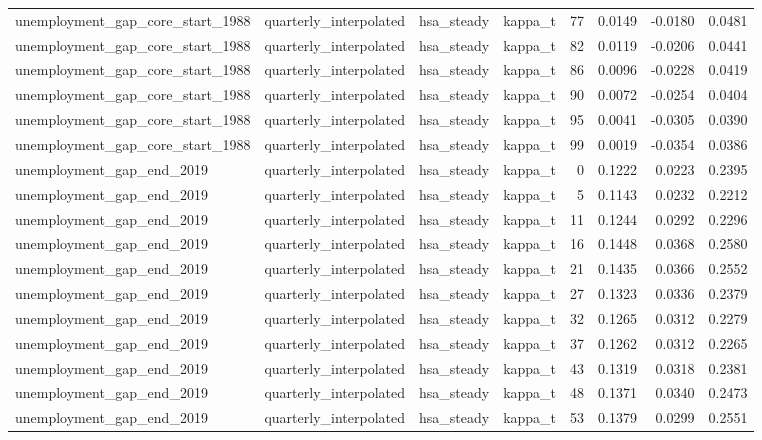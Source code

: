 \begin{tabular}{llllrrrr}
unemployment\_gap\_core\_start\_1988 & quarterly\_interpolated & hsa\_steady & kappa\_t & 77 & 0.0149 & -0.0180 & 0.0481 \\
unemployment\_gap\_core\_start\_1988 & quarterly\_interpolated & hsa\_steady & kappa\_t & 82 & 0.0119 & -0.0206 & 0.0441 \\
unemployment\_gap\_core\_start\_1988 & quarterly\_interpolated & hsa\_steady & kappa\_t & 86 & 0.0096 & -0.0228 & 0.0419 \\
unemployment\_gap\_core\_start\_1988 & quarterly\_interpolated & hsa\_steady & kappa\_t & 90 & 0.0072 & -0.0254 & 0.0404 \\
unemployment\_gap\_core\_start\_1988 & quarterly\_interpolated & hsa\_steady & kappa\_t & 95 & 0.0041 & -0.0305 & 0.0390 \\
unemployment\_gap\_core\_start\_1988 & quarterly\_interpolated & hsa\_steady & kappa\_t & 99 & 0.0019 & -0.0354 & 0.0386 \\
unemployment\_gap\_end\_2019 & quarterly\_interpolated & hsa\_steady & kappa\_t & 0 & 0.1222 & 0.0223 & 0.2395 \\
unemployment\_gap\_end\_2019 & quarterly\_interpolated & hsa\_steady & kappa\_t & 5 & 0.1143 & 0.0232 & 0.2212 \\
unemployment\_gap\_end\_2019 & quarterly\_interpolated & hsa\_steady & kappa\_t & 11 & 0.1244 & 0.0292 & 0.2296 \\
unemployment\_gap\_end\_2019 & quarterly\_interpolated & hsa\_steady & kappa\_t & 16 & 0.1448 & 0.0368 & 0.2580 \\
unemployment\_gap\_end\_2019 & quarterly\_interpolated & hsa\_steady & kappa\_t & 21 & 0.1435 & 0.0366 & 0.2552 \\
unemployment\_gap\_end\_2019 & quarterly\_interpolated & hsa\_steady & kappa\_t & 27 & 0.1323 & 0.0336 & 0.2379 \\
unemployment\_gap\_end\_2019 & quarterly\_interpolated & hsa\_steady & kappa\_t & 32 & 0.1265 & 0.0312 & 0.2279 \\
unemployment\_gap\_end\_2019 & quarterly\_interpolated & hsa\_steady & kappa\_t & 37 & 0.1262 & 0.0312 & 0.2265 \\
unemployment\_gap\_end\_2019 & quarterly\_interpolated & hsa\_steady & kappa\_t & 43 & 0.1319 & 0.0318 & 0.2381 \\
unemployment\_gap\_end\_2019 & quarterly\_interpolated & hsa\_steady & kappa\_t & 48 & 0.1371 & 0.0340 & 0.2473 \\
unemployment\_gap\_end\_2019 & quarterly\_interpolated & hsa\_steady & kappa\_t & 53 & 0.1379 & 0.0299 & 0.2551 \\

\end{tabular}
